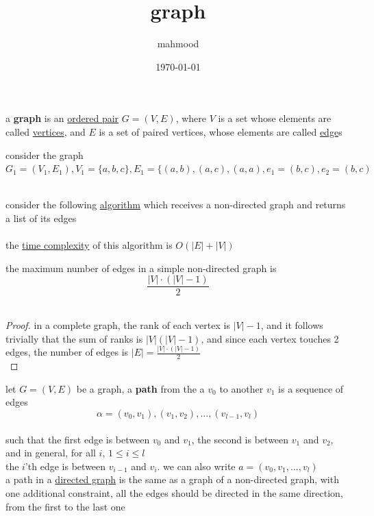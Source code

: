 \documentclass[a4paper,12pt]{article}
\author{mahmood}
\date{\today}
\title{graph}
\begin{document}
\maketitle
\begin{definition}
a \textbf{graph} is an \href{discrete_maths2.org}{ordered pair} \(G = (V, E)\), where \(V\) is a set whose elements are called \href{20230314001051-graph.org}{vertices}, and \(E\) is a set of paired vertices, whose elements are called \href{20230314001632-edge.org}{edge}s\\
\end{definition}
\begin{my_example}
consider the graph \(G_1=(V_1,E_1),V_1=\{a,b,c\},E_1=\{(a,b),(a,c),(a,a),e_1=(b,c),e_2=(b,c)\)\\
\\
\end{my_example}
\begin{my_example}
consider the following \href{20220706211958-algorithm.org}{algorithm} which receives a non-directed graph and returns a list of its edges\\
\\

the \href{20221130014441-time_complexity.org}{time complexity} of this algorithm is \(O(|E|+|V|)\)\\
\end{my_example}
\begin{lemma}
the maximum number of edges in a simple non-directed graph is\\
\[
\frac{|V| \cdot (|V|-1)}{2}
\]\\
\begin{proof}
in a complete graph, the rank of each vertex is \(|V|-1\), and it follows trivially that the sum of ranks is \(|V|(|V|-1)\), and since each vertex touches 2 edges, the number of edges is \(|E|=\frac{|V| \cdot (|V|-1)}{2}\)\\
\end{proof}
\end{lemma}
\begin{definition}
let \(G=(V,E)\) be a graph, a \textbf{path} from the a \(v_0\) to another \(v_1\) is a sequence of edges\\
\[
\alpha = (v_0,v_1),(v_1,v_2),\dots,(v_{l-1},v_l)
\]\\
such that the first edge is between \(v_0\) and \(v_1\), the second is between \(v_1\) and \(v_2\), and in general, for all \(i\), \(1 \le i \le l\)\\
the \(i\)'th edge is between \(v_{i-1}\) and \(v_i\). we can also write \(a=(v_0,v_1,\dots,v_l)\)\\
a path in a \href{20230314002402-directed_graph.org}{directed graph} is the same as a graph of a non-directed graph, with one additional constraint, all the edges should be directed in the same direction, from the first to the last one\\
\end{definition}
\end{document}
